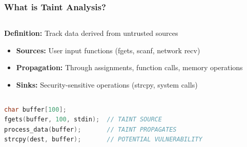 \documentclass[aspectratio=169]{beamer}
\begin{document}
\begin{frame}[fragile]
    \frametitle{What is Taint Analysis?}
    \vspace{1em}
    \begin{columns}
        \begin{column}{0.5\textwidth}
            \textbf{Definition:} Track data derived from untrusted sources
            
            \begin{itemize}
                \item \textbf{Sources:} User input functions (fgets, scanf, network recv)
                \item \textbf{Propagation:} Through assignments, function calls, memory operations
                \item \textbf{Sinks:} Security-sensitive operations (strcpy, system calls)
            \end{itemize}
        \end{column}
        \begin{column}{0.5\textwidth}
        \end{column}
    \end{columns}
    
    \vspace{1em}
    \begin{lstlisting}[language=C]
char buffer[100];
fgets(buffer, 100, stdin);  // TAINT SOURCE
process_data(buffer);       // TAINT PROPAGATES  
strcpy(dest, buffer);       // POTENTIAL VULNERABILITY
    \end{lstlisting}
\end{frame}
\end{document}
